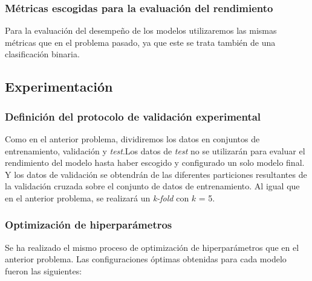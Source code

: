 
\subsubsection{Métricas escogidas para la evaluación del rendimiento}

Para la evaluación del desempeño de los modelos utilizaremos las mismas métricas que en el problema pasado, ya que este se trata también de una clasificación binaria. 


\subsection{Experimentación}

\subsubsection{Definición del protocolo de validación experimental}

Como en el anterior problema, dividiremos los datos en conjuntos de entrenamiento, validación y \textit{test}.Los datos de \textit{test} no se utilizarán para evaluar el rendimiento del modelo hasta haber escogido y configurado un solo modelo final. Y los datos de validación se obtendrán de las diferentes particiones resultantes de la validación cruzada sobre el conjunto de datos de entrenamiento. Al igual que en el anterior problema, se realizará un \textit{k-fold} con $k$ = 5.


\subsubsection{Optimización de hiperparámetros}

Se ha realizado el mismo proceso de optimización de hiperparámetros que en el anterior problema. Las configuraciones óptimas obtenidas para cada modelo fueron las siguientes:


